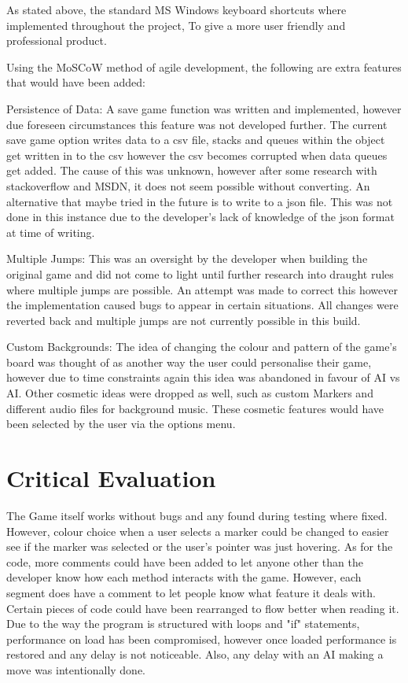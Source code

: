 \documentclass[10pt, a4paper]{article}
\begin{document}
As stated above, the standard MS Windows keyboard shortcuts where implemented throughout the project, To give a more user friendly and professional product. 


Using the MoSCoW method of agile development, the following are extra features that would have been added:


Persistence of Data: A save game function was written and implemented, however due foreseen circumstances this feature was not developed further. The current save game option writes data to a csv file, stacks and queues within the object get written in to the csv however the csv becomes corrupted when data queues get added. The cause of this was unknown, however after some research with stackoverflow and MSDN, it does not seem possible without converting. An alternative that maybe tried in the future is to write to a json file. This was not done in this instance due to the developer's lack of knowledge of the json format at time of writing.

Multiple Jumps: This was an oversight by the developer when building the original game and did not come to light until further research into draught rules where multiple jumps are possible. An attempt was made to correct this however the implementation caused bugs to appear in certain situations. All changes were reverted back and multiple jumps are not currently possible in this build.

Custom Backgrounds: The idea of changing the colour and pattern of the game's board was thought of as another way the user could personalise their game, however due to time constraints again this idea was abandoned in favour of AI vs AI. Other cosmetic ideas were dropped as well, such as custom Markers and different audio files for background music. These cosmetic features would have been selected by the user via the options menu. 
	
	\section{Critical Evaluation}
The Game itself works without bugs and any found during testing where fixed. However, colour choice when a user selects a marker could be changed to easier see if the marker was selected or the user's pointer was just hovering. As for the code, more comments could have been added to let anyone other than the developer know how each method interacts with the game. However, each segment does have a comment to let people know what feature it deals with. Certain pieces of code could have been rearranged to flow better when reading it. Due to the way the program is structured with loops and "if" statements, performance on load has been compromised, however once loaded performance is restored and any delay is not noticeable. Also, any delay with an AI making a move was intentionally done.
\end{document}
